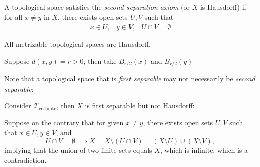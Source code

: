 \begin{definition}
A topological space satisfies the \emph{second separation axiom} (or $X$ is Hausdorff) if for all $x\ne y$ in $X$, there exists open sets $U,V$ such that
\[
\begin{array}{lll}
x\in U,
&
y\in V,
&
U\cap V=\emptyset
\end{array}
\]
\end{definition}

\begin{example}
All metrizable topological spaces are Hausdorff.

Suppose $d(x,y)=r>0$, then take $B_{r/2}(x)$ and $B_{r/2}(y)$
\end{example}

\begin{example}
Note that a topological space that is \emph{first separable} may not necessarily be \emph{second separable}:

Consider $\mathcal{T}_{\text{co-finite}}$, then $X$ is first separable but not Hausdorff:

Suppose on the contrary that for given $x\ne y$, there exists open sets $U,V$ such that $x\in U,y\in V$, and
\[
U\cap V=\emptyset\implies
X = X\setminus (U\cap V) = (X\setminus U)\cup(X\setminus V),
\]
implying that the union of two finite sets equals $X$, which is infinite, which is a contradiction.
\end{example}

















